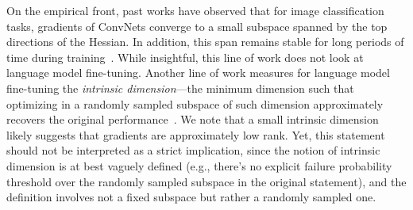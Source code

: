 On the empirical front, past works have observed that for image classification tasks, gradients of ConvNets converge to a small subspace spanned by the top directions of the Hessian. In addition, this span remains stable for long periods of time during training~\citep{gur2018gradient}.
While insightful, this line of work does not look at language model fine-tuning.
Another line of work measures for language model fine-tuning the \emph{intrinsic dimension}---the minimum dimension such that optimizing in a randomly sampled subspace of such dimension approximately recovers the original performance~\citep{li2018measuring,aghajanyan2020intrinsic}. 
We note that a small intrinsic dimension likely suggests that gradients are approximately low rank. 
Yet, this statement should not be interpreted as a strict implication, since the notion of intrinsic dimension is at best vaguely defined (e.g., there's no explicit failure probability threshold over the randomly sampled subspace in the original statement), and the definition involves not a fixed subspace but rather a randomly sampled one.
